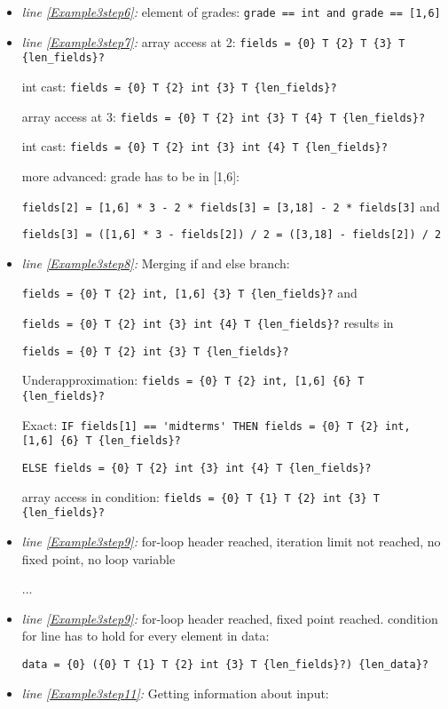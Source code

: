 \documentclass[11pt]{article}
\begin{document}
\begin{itemize}
\item \textit{line \ref{Example3step6}:} element of grades: \verb|grade == int and grade == [1,6]|

\item \textit{line \ref{Example3step7}:} array access at 2: \verb|fields = {0} T {2} T {3} T {len_fields}?|

int cast: \verb|fields = {0} T {2} int {3} T {len_fields}?|

array access at 3: \verb|fields = {0} T {2} int {3} T {4} T {len_fields}?|

int cast: \verb|fields = {0} T {2} int {3} int {4} T {len_fields}?|

more advanced: grade has to be in [1,6]: 

\verb|fields[2] = [1,6] * 3 - 2 * fields[3] = [3,18] - 2 * fields[3]| and

\verb|fields[3] = ([1,6] * 3 - fields[2]) / 2 = ([3,18] - fields[2]) / 2|

\item \textit{line \ref{Example3step8}:} Merging if and else branch: 

\verb|fields = {0} T {2} int, [1,6] {3} T {len_fields}?| and 

\verb|fields = {0} T {2} int {3} int {4} T {len_fields}?| results in

\verb|fields = {0} T {2} int {3} T {len_fields}?|

Underapproximation: \verb|fields = {0} T {2} int, [1,6] {6} T {len_fields}?|

Exact: \verb|IF fields[1] == 'midterms' THEN fields = {0} T {2} int, [1,6] {6} T {len_fields}?|

\verb|ELSE fields = {0} T {2} int {3} int {4} T {len_fields}?|

array access in condition: \verb|fields = {0} T {1} T {2} int {3} T {len_fields}?|

\item \textit{line \ref{Example3step9}:} for-loop header reached, iteration limit not reached, no fixed point, no loop variable

...

\item \textit{line \ref{Example3step9}:} for-loop header reached, fixed point reached. condition for line has to hold for every element in data:

\verb|data = {0} ({0} T {1} T {2} int {3} T {len_fields}?) {len_data}?|


\item \textit{line \ref{Example3step11}:} Getting information about input: 


\end{itemize}
\end{document}
